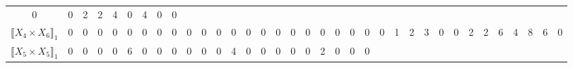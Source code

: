 \documentclass[12pt]{article}
\theoremstyle{definition}
\theoremstyle{remark}
\begin{document}
{\begin{table}[H]
\begin{adjustbox}{angle=90}
{\begin{tabular}{c||c|c|c|c|c|c|c|c|c|c|c|c|c|c|c|c|c|c|c|c|c|c|c|c|c|c|c|c|c|c|c|c|c|c}
0  & %
0  & %
2  & %
2  & %
4  & %
0  & %
4  & %
0  & %
0   %
\\
$\llbracket X_4 \times X_6 \rrbracket_1$ &
0  & %
0  & %
0  & %
0  & %
0  & %
0  & %
0  & %
0  & %
0  & %
0  & %
0  & %
0  & %
0  & %
0  & %
0  & %
0  & %
0  & %
0  & %
0  & %
0  & %
0  & %
0  & %
1  & %
2  & %
3  & %
0  & %
0  & %
2  & %
2  & %
6  & %
4  & %
8  & %
6  & %
0   %
\\
$\llbracket X_5 \times X_5 \rrbracket_1$ &
0  & %
0  & %
0  & %
0  & %
6  & %
0  & %
0  & %
0  & %
0  & %
0  & %
0  & %
4  & %
0  & %
0  & %
0  & %
0  & %
0  & %
2  & %
0  & %
0  & %
0  & %

\end{tabular}}
\end{adjustbox}
\end{table}}
\end{document}
